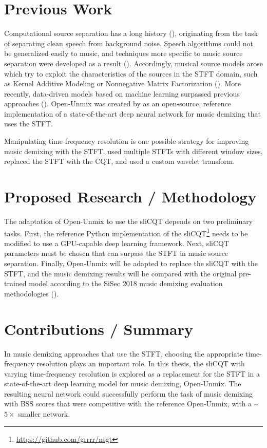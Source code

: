 \documentclass[letter,12pt]{article}
\begin{document}
\section{Previous Work}

Computational source separation has a long history (\cite{musicsepgood}), originating from the task of separating clean speech from background noise. Speech algorithms could not be generalized easily to music, and techniques more specific to music source separation were developed as a result (\cite{musicseptechniques1}). Accordingly, musical source models arose which try to exploit the characteristics of the sources in the STFT domain, such as Kernel Additive Modeling or Nonnegative Matrix Factorization (\cite{musicsepgood}). More recently, data-driven models based on machine learning surpassed previous approaches (\cite{sisec2018}). Open-Unmix was created by \textcite{umx} as an open-source, reference implementation of a state-of-the-art deep neural network for music demixing that uses the STFT.

Manipulating time-frequency resolution is one possible strategy for improving music demixing with the STFT. \textcite{driedger} used multiple STFTs with different window sizes, \textcite{fitzgerald2} replaced the STFT with the CQT, and \textcite{wavelets} used a custom wavelet transform.

\section{Proposed Research / Methodology}

The adaptation of Open-Unmix to use the sliCQT depends on two preliminary tasks. First, the reference Python implementation of the sliCQT\footnote{\url{https://github.com/grrrr/nsgt}} needs to be modified to use a GPU-capable deep learning framework. Next, sliCQT parameters must be chosen that can surpass the STFT in music source separation. Finally, Open-Unmix will be adapted to replace the sliCQT with the STFT, and the music demixing results will be compared with the original pre-trained model according to the SiSec 2018 music demixing evaluation methodologies (\cite{sisec2018}).

\section{Contributions / Summary}

In music demixing approaches that use the STFT, choosing the appropriate time-frequency resolution plays an important role. In this thesis, the sliCQT with varying time-frequency resolution is explored as a replacement for the STFT in a state-of-the-art deep learning model for music demixing, Open-Unmix. The resulting neural network could successfully perform the task of music demixing with BSS scores that were competitive with the reference Open-Unmix, with a \textasciitilde$5 \times$ smaller network.

\vfill
\clearpage %

\printbibheading[title={References},heading=bibnumbered]
\printbibliography[heading=none]

\vfill
\clearpage %
\end{document}
